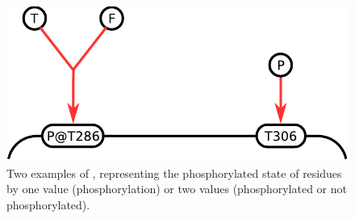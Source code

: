 \begin{figure}[H]
  \centering
  \includegraphics[scale = 0.5]{examples/ex-assignment}
  \caption{Two examples of , representing the phosphorylated state of residues by one value (phosphorylation) or two values (phosphorylated or not phosphorylated).}
  \label{fig:ex-assignment}
\end{figure}


\normalcolor
